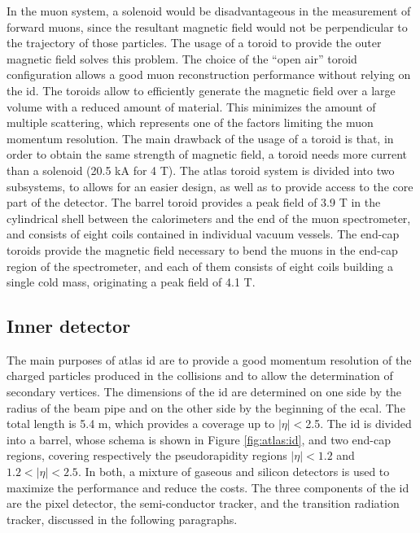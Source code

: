 In the muon system, a solenoid would be disadvantageous in the measurement of forward muons, since the resultant magnetic field would not be perpendicular to the trajectory of those particles. The usage of a toroid to provide the outer magnetic field solves this problem. 
The choice of the “open air” toroid configuration allows a good muon
reconstruction performance without relying on the \gls{id}. 
The toroids allow to efficiently generate the magnetic field over a large volume with a reduced amount
of material. This minimizes the amount of multiple scattering, which represents one
of the factors limiting the muon momentum resolution.
The main drawback of the usage of a toroid is that, in order to obtain the same strength of magnetic field, a toroid needs more current than a solenoid (20.5 kA for 4 T).
The \gls{atlas} toroid system is divided into two subsystems, to allows for an easier design, 
as well as to provide access to the core part of the detector.
The barrel toroid \cite{ATLAS:1997ac} provides a peak field of 3.9 T in the cylindrical shell between the calorimeters and the end of the muon spectrometer, and consists of eight coils contained in individual vacuum vessels.  
The end-cap toroids \cite{ATLAS:1997ab} provide the magnetic field necessary to bend the muons in the end-cap region of the spectrometer, and each of them consists of eight coils building a single cold mass, originating a peak field of 4.1 T. 



\subsection{Inner detector}
\label{sec:atlas:id}

The main purposes of \gls{atlas} \gls{id} \cite{ATLAS:1997ag,ATLAS:1997af} are to provide a good momentum resolution of the charged particles produced in the collisions and to allow the determination of secondary vertices. The dimensions of the \gls{id} are determined on one side by the 
radius of the beam pipe and on the other side by the beginning of the \gls{ecal}. The total length is 5.4 m, which provides a coverage up to $|\eta|<$2.5.
The \gls{id} is divided into a barrel, whose schema is shown in Figure \ref{fig:atlas:id}, and two end-cap regions, covering respectively the pseudorapidity regions $|\eta|<1.2$ and $1.2<|\eta|<2.5$. In both, a mixture of gaseous and silicon detectors is used to maximize the performance and reduce the costs. The three components of the \gls{id} are the pixel detector, the semi-conductor tracker, and the transition radiation tracker, discussed in the following paragraphs.

